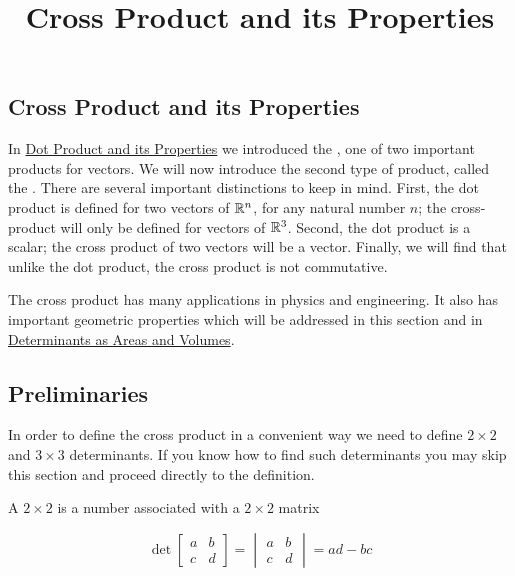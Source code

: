 \documentclass{ximera}
\title{Cross Product and its Properties} \license{CC BY-NC-SA 4.0}
\begin{document}
\begin{abstract}
\end{abstract}
\maketitle
\begin{onlineOnly}
\section*{Cross Product and its Properties}
\end{onlineOnly}

In \href{https://ximera.osu.edu/linearalgebradzv3/LinearAlgebraInteractiveIntro/VEC-0050/main}{Dot Product and its Properties} we introduced the , one of two important products for vectors.  We will now introduce the second type of product, called the .  There are several important distinctions to keep in mind.  First, the dot product is defined for two vectors of $\mathbb{R}^n$, for any  natural number $n$; the cross-product will only be defined for vectors of $\mathbb{R}^3$.  Second, the dot product is a scalar; the cross product of two vectors will be a vector.  Finally, we will find that unlike the dot product, the cross product is not commutative.  

The cross product has many applications in physics and engineering.  It also has important geometric properties which will be addressed in this section and in \href{https://ximera.osu.edu/linearalgebradzv3/LinearAlgebraInteractiveIntro/DET-0070/main}{Determinants as Areas and Volumes}.

\subsection*{Preliminaries}
In order to define the cross product in a convenient way we need to define $2\times 2$ and $3\times 3$ determinants.  If you know how to find such determinants you may skip this section and proceed directly to the definition.

\begin{definition}\label{def:twodetcrossprod}
A $2\times 2$  is a number associated with a $2\times 2$ matrix

$$\det{\begin{bmatrix}
a & b\\
c & d
\end{bmatrix}}=\begin{vmatrix}
a & b\\
c & d
\end{vmatrix} =ad-bc$$

\end{definition}
\end{document}
